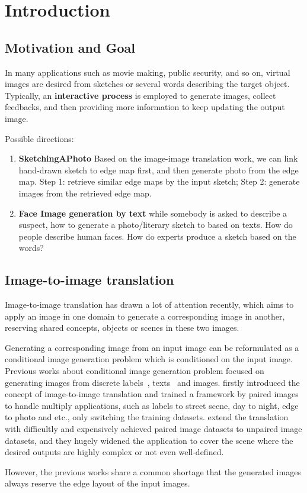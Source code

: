 \section{Introduction}
\subsection{Motivation and Goal}
In many applications such as movie making, public security, and so on, virtual images are desired from sketches or several words describing the target object. Typically, an \textbf{interactive process} is employed to generate images, collect feedbacks, and then providing more information to keep updating the output image.

Possible directions:
\begin{enumerate}
	\item \textbf{SketchingAPhoto} Based on the image-image translation work, we can link hand-drawn sketch to edge map first, and then generate photo from the edge map. Step 1: retrieve similar edge maps by the input sketch; Step 2: generate images from the retrieved edge map.
	\item \textbf{Face Image generation by text} while somebody is asked to describe a suspect, how to generate a photo/literary sketch to based on texts. How do people describe human faces. How do experts produce a sketch based on the words? 
\end{enumerate}


\subsection{Image-to-image translation}
Image-to-image translation has drawn a lot of attention recently, which aims to apply an image in one domain to generate a corresponding image in another, reserving shared concepts, objects or scenes in these two images.  

Generating a corresponding image from an input image can be reformulated as a conditional image generation problem which is conditioned on the input image. Previous works about conditional image generation problem focused on generating images from discrete labels~\cite{CGAN}, texts~\cite{Reed2016} and images.
\cite{pix2pix} firstly introduced the concept of image-to-image translation and trained a framework by paired images to handle multiply applications, such as labels to street scene, day to night, edge to photo and etc., only switching the training datasets.
%
\cite{CycleGAN, DiscoGAN, UNIT} extend the translation with difficultly and expensively achieved paired image datasets to unpaired image datasets, and they hugely widened the application to cover the scene where the desired outputs are highly complex or not even well-defined.

However, the previous works share a common shortage that the generated images always reserve the edge layout of the input images. 